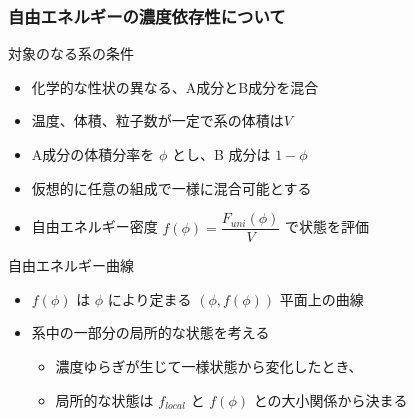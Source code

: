 \documentclass[12pt, dvipdfmx]{beamer}
\begin{document}
\begin{frame}
	\frametitle{自由エネルギーの濃度依存性について}
		\begin{block}{対象のなる系の条件}
			\begin{itemize}
				\item 化学的な性状の異なる、A成分とB成分を混合
				\item 温度、体積、粒子数が一定で系の体積は$V$
				\item A成分の体積分率を $\phi$ とし、B 成分は $1-\phi$
				\item \alert{仮想的に任意の組成で一様に混合可能}とする
				\item 自由エネルギー密度 $f(\phi)=\dfrac{F_{uni}(\phi)}{V}$ で状態を評価
			\end{itemize}
		\end{block}
		\begin{alertblock}{自由エネルギー曲線}
			\begin{itemize}
				\item $f(\phi)$ は $\phi$ により定まる $(\phi, f(\phi) )$ 平面上の曲線
				\item 系中の一部分の局所的な状態を考える
				\begin{itemize}
					\item 濃度ゆらぎが生じて一様状態から変化したとき、
					\item 局所的な状態は $f_{local}$ と $f(\phi)$ との大小関係から決まる
				\end{itemize}
			\end{itemize}
		\end{alertblock}
\end{frame}
\end{document}
